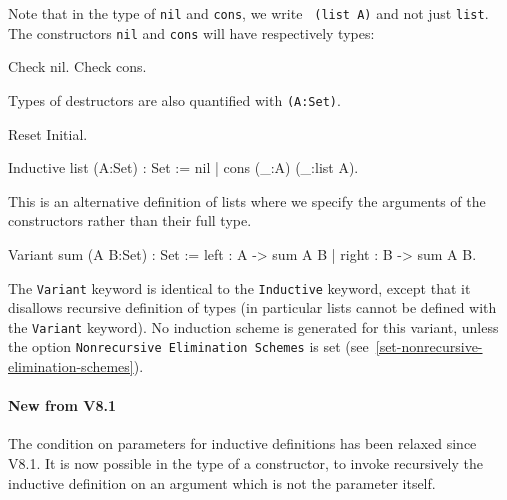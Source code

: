 Note that in the type of {\tt nil} and {\tt cons}, we write {\tt
  (list A)} and not just {\tt list}.\\ The constructors {\tt nil} and
{\tt cons} will have respectively types:

\begin{coq_example}
Check nil.
Check cons.
\end{coq_example}

Types of destructors are also quantified with {\tt (A:Set)}.

\begin{coq_eval}
Reset Initial.
\end{coq_eval}
\begin{Variants}
\item
\begin{coq_example*}
Inductive list (A:Set) : Set := nil | cons (_:A) (_:list A).
\end{coq_example*}
This is an alternative definition of lists where we specify the
arguments of the constructors rather than their full type.
\item
\begin{coq_example*}
Variant sum (A B:Set) : Set := left : A -> sum A B | right : B -> sum A B.
\end{coq_example*}
The {\tt Variant} keyword is identical to the {\tt Inductive} keyword,
except that it disallows recursive definition of types (in particular
lists cannot be defined with the {\tt Variant} keyword). No induction
scheme is generated for this variant, unless the option
{\tt Nonrecursive Elimination Schemes} is set
(see~\ref{set-nonrecursive-elimination-schemes}).
\end{Variants}

\begin{ErrMsgs}
\item {}
\end{ErrMsgs}

\paragraph{New from \Coq{} V8.1} The condition on parameters for
inductive definitions has been relaxed since \Coq{} V8.1. It is now
possible in the type of a constructor, to invoke recursively the
inductive definition on an argument which is not the parameter itself.

